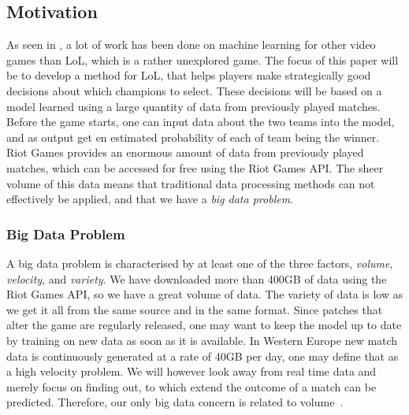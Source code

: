 \subsection{Motivation}\label{sec:motivation}%
As seen in , a lot of work has been done on machine learning for other video games than LoL, which is a rather unexplored game. The focus of this paper will be to develop a method for LoL, that helps players make strategically good decisions about which champions to select.
These decisions will be based on a model learned using a large quantity of data from previously played matches. Before the game starts, one can input data about the two teams into the model, and as output get en estimated probability of each of team being the winner.
Riot Games provides an enormous amount of data from previously played matches, which can be accessed for free using the Riot Games API.\@
The sheer volume of this data means that traditional data processing methods can not effectively be applied, and that we have a \emph{big data problem}. 


\subsubsection{Big Data Problem}\label{sec:big_data_problem}
A big data problem is characterised by at least one of the three factors, \emph{volume}, \emph{velocity}, and \emph{variety}. We have downloaded more than 400GB of data using the Riot Games API, so we have a great volume of data. The variety of data is low as we get it all from the same source and in the same format. Since patches that alter the game are regularly released, one may want to keep the model up to date by training on new data as soon as it is available. 
In Western Europe new match data is continuously generated at a rate of 40GB per day, one may define that as a high velocity problem. We will however look away from real time data and merely focus on finding out, to which extend the outcome of a match can be predicted. Therefore, our only big data concern is related to volume~\cite{madden2012databases}.

